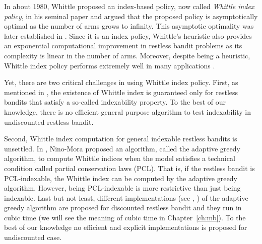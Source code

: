 In about 1980, Whittle proposed an index-based policy, now called \emph{Whittle index policy}, in his seminal paper \cite{whittle1988restless} and argued that the proposed policy is asymptotically optimal as the number of arms grows to infinity.
This asymptotic optimality was later established in \cite{weber1990index}.
Since it is an index policy, Whittle's heuristic also provides an exponential computational improvement in restless bandit problems as its complexity is linear in the number of arms.
Moreover, despite being a heuristic, Whittle index policy performs extremely well in many applications \cite{glazebrook2002index, ansell2003whittle, glazebrook2006some, avrachenkov2013congestion, akbarzadeh2019restless}.

Yet, there are two critical challenges in using Whittle index policy.
First, as mentioned in \cite[Chapter~14]{whittle1996optimal}, the existence of Whittle index is guaranteed only for restless bandits that satisfy a so-called indexability property.
To the best of our knowledge, there is no efficient general purpose algorithm to test indexability in undiscounted restless bandit.

Second, Whittle index computation for general indexable restless bandits is unsettled.
In \cite{nino2007dynamic}, Nino-Mora proposed an algorithm, called the adaptive greedy algorithm, to compute Whittle indices when the model satisfies a technical condition called partial conservation laws (PCL).
That is, if the restless bandit is PCL-indexable, the Whittle index can be computed by the adaptive greedy algorithm.
However, being PCL-indexable is more restrictive than just being indexable.
Last but not least, different implementations (see \eg, \cite{nino2020fast, akbarzadeh2020conditions}) of the adaptive greedy algorithm are proposed for discounted restless bandit and they run in cubic time (we will see the meaning of cubic time in Chapter~\ref{ch:mb}).
To the best of our knowledge no efficient and explicit implementations is proposed for undiscounted case.

